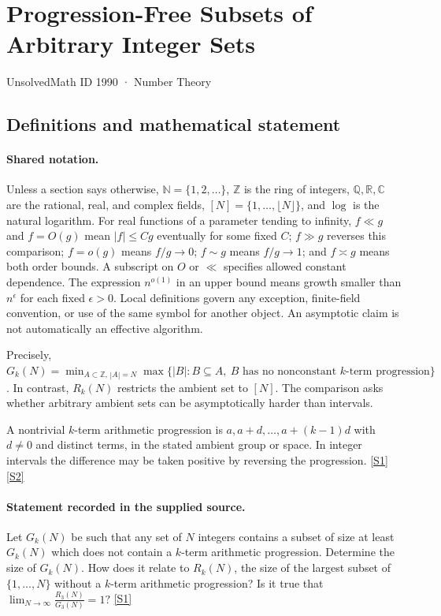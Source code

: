 \documentclass[11pt,a4paper]{article}
\newcommand{\N}{\mathbb{N}}
\newcommand{\Z}{\mathbb{Z}}
\newcommand{\Q}{\mathbb{Q}}
\newcommand{\R}{\mathbb{R}}
\newcommand{\C}{\mathbb{C}}
\newcommand{\sref}[2]{\hyperlink{source:#1:#2}{[S#2]}}
\begin{document}

\setcounter{section}{1989}

\section{Progression-Free Subsets of Arbitrary Integer Sets}\label{1990}

{\small\sffamily UnsolvedMath ID 1990 · Number Theory}

\subsection{Definitions and mathematical statement}

\paragraph{Shared notation.}Unless a section says otherwise, $\N=\{1,2,\ldots\}$,
$\Z$ is the ring of integers, $\Q,\R,\C$ are the rational, real, and complex
fields, $[N]=\{1,\ldots,\lfloor N\rfloor\}$, and $\log$ is the natural
logarithm. For real functions of a parameter tending to infinity,
$f\ll g$ and $f=O(g)$ mean $|f|\leq Cg$ eventually for some fixed $C$;
$f\gg g$ reverses this comparison; $f=o(g)$ means $f/g\to0$;
$f\sim g$ means $f/g\to1$; and $f\asymp g$ means both order bounds.
A subscript on $O$ or $\ll$ specifies allowed constant dependence.
The expression $n^{o(1)}$ in an upper bound means growth smaller than
$n^\epsilon$ for each fixed $\epsilon>0$. Local definitions govern any
exception, finite-field convention, or use of the same symbol for another
object. An asymptotic claim is not automatically an effective algorithm.



Precisely, $G_k(N)=\min_{A\subset\Z,\,|A|=N}\max\{|B|:B\subseteq A,\ B\text{ has no nonconstant }k\text{-term progression}\}$. In contrast, $R_k(N)$ restricts the ambient set to $[N]$. The comparison asks whether arbitrary ambient sets can be asymptotically harder than intervals.

A nontrivial $k$-term arithmetic progression is $a,a+d,\ldots,a+(k-1)d$ with $d\ne0$ and distinct terms, in the stated ambient group or space. In integer intervals the difference may be taken positive by reversing the progression. \sref{1990}{1} \sref{1990}{2}

\paragraph{Statement recorded in the supplied source.}
Let $G_k(N)$ be such that any set of $N$ integers contains a subset of size at least $G_k(N)$ which does not contain a $k$-term arithmetic progression. Determine the size of $G_k(N)$. How does it relate to $R_k(N)$, the size of the largest subset of $\{1,\ldots,N\}$ without a $k$-term arithmetic progression? Is it true that $ \lim_{N\to \infty}\frac{R_3(N)}{G_3(N)}=1? $ \sref{1990}{1}
\end{document}
